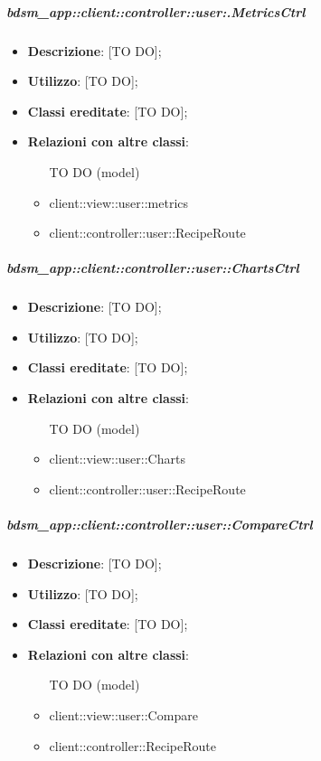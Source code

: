 		\subparagraph{bdsm\_app::client::controller::user:.MetricsCtrl} %
		\label{subp:client_controller_user_metricsctrl}
			\begin{itemize}
				\item \textbf{Descrizione}: [TO DO];
				\item \textbf{Utilizzo}: [TO DO];
				\item \textbf{Classi ereditate}: [TO DO];
				\item \textbf{Relazioni con altre classi}:
					\begin{itemize}
						\item [TO DO] (model)
						\item client::view::user::metrics
						\item client::controller::user::RecipeRoute
					\end{itemize}
			\end{itemize}

		\subparagraph{bdsm\_app::client::controller::user::ChartsCtrl} %
		\label{subp:client_controller_user_chartsctrl}
			\begin{itemize}
				\item \textbf{Descrizione}: [TO DO];
				\item \textbf{Utilizzo}: [TO DO];
				\item \textbf{Classi ereditate}: [TO DO];
				\item \textbf{Relazioni con altre classi}:
					\begin{itemize}
						\item [TO DO] (model)
						\item client::view::user::Charts
						\item client::controller::user::RecipeRoute
					\end{itemize}
			\end{itemize}

		\subparagraph{bdsm\_app::client::controller::user::CompareCtrl} %
		\label{subp:client_controller_user_comparectrl}
			\begin{itemize}
				\item \textbf{Descrizione}: [TO DO];
				\item \textbf{Utilizzo}: [TO DO];
				\item \textbf{Classi ereditate}: [TO DO];
				\item \textbf{Relazioni con altre classi}:
					\begin{itemize}
						\item [TO DO] (model)
						\item client::view::user::Compare
						\item client::controller::RecipeRoute
					\end{itemize}
			\end{itemize}

